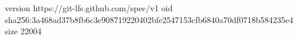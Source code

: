 version https://git-lfs.github.com/spec/v1
oid sha256:3a468ad37b8fb6c3e908719220402bfe2547153cfb6840a70df0718b584235e4
size 22004
